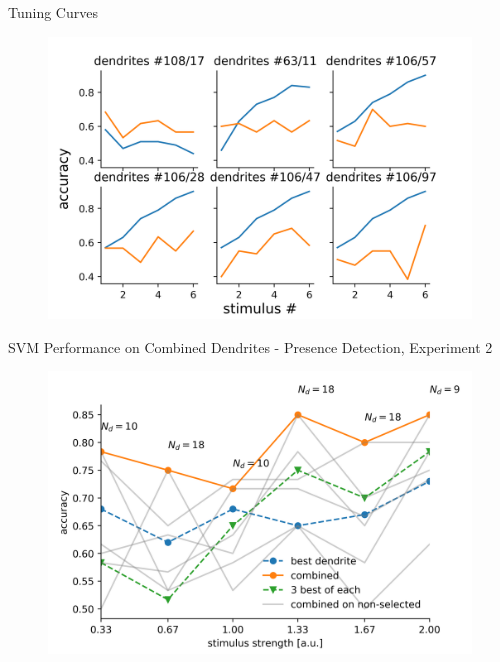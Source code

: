 \documentclass[10pt]{beamer}
\begin{document}
\begin{frame}[fragile]{Tuning Curves}
\begin{center}
	\begin{figure}
      \includegraphics[width=1.0\textwidth]{tuning.png}
	\end{figure}
	\end{center}
\end{frame}

\begin{frame}[fragile]{SVM Performance on Combined Dendrites - Presence Detection, Experiment 2}
\begin{center}
	\begin{figure}
      \includegraphics[width=1.0\textwidth]{combined_presence.png}
	\end{figure}
	\end{center}
\end{frame}
\end{document}
